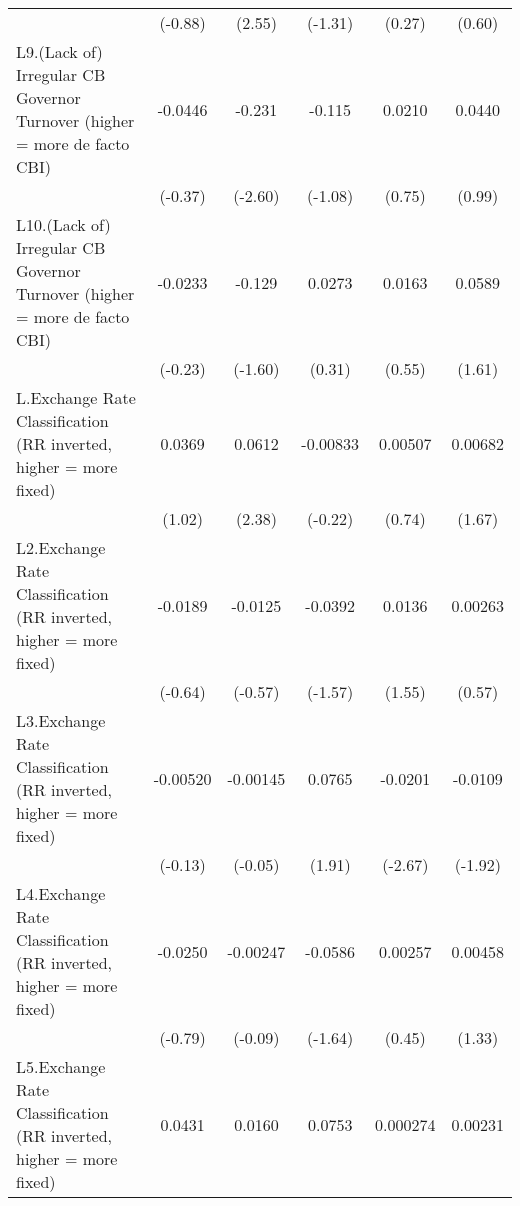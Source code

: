 {\begin{longtable}{l*{5}{c}}
                &  (-0.88)         &   (2.55)         &  (-1.31)         &   (0.27)         &   (0.60)         \\
\addlinespace
L9.(Lack of) Irregular CB Governor Turnover (higher = more de facto CBI)&  -0.0446         &   -0.231\sym{*}  &   -0.115         &   0.0210         &   0.0440         \\
                &  (-0.37)         &  (-2.60)         &  (-1.08)         &   (0.75)         &   (0.99)         \\
\addlinespace
L10.(Lack of) Irregular CB Governor Turnover (higher = more de facto CBI)&  -0.0233         &   -0.129         &   0.0273         &   0.0163         &   0.0589         \\
                &  (-0.23)         &  (-1.60)         &   (0.31)         &   (0.55)         &   (1.61)         \\
\addlinespace
L.Exchange Rate Classification (RR inverted, higher = more fixed)&   0.0369         &   0.0612\sym{*}  & -0.00833         &  0.00507         &  0.00682         \\
                &   (1.02)         &   (2.38)         &  (-0.22)         &   (0.74)         &   (1.67)         \\
\addlinespace
L2.Exchange Rate Classification (RR inverted, higher = more fixed)&  -0.0189         &  -0.0125         &  -0.0392         &   0.0136         &  0.00263         \\
                &  (-0.64)         &  (-0.57)         &  (-1.57)         &   (1.55)         &   (0.57)         \\
\addlinespace
L3.Exchange Rate Classification (RR inverted, higher = more fixed)& -0.00520         & -0.00145         &   0.0765         &  -0.0201\sym{**} &  -0.0109         \\
                &  (-0.13)         &  (-0.05)         &   (1.91)         &  (-2.67)         &  (-1.92)         \\
\addlinespace
L4.Exchange Rate Classification (RR inverted, higher = more fixed)&  -0.0250         & -0.00247         &  -0.0586         &  0.00257         &  0.00458         \\
                &  (-0.79)         &  (-0.09)         &  (-1.64)         &   (0.45)         &   (1.33)         \\
\addlinespace
L5.Exchange Rate Classification (RR inverted, higher = more fixed)&   0.0431         &   0.0160         &   0.0753\sym{*}  & 0.000274         &  0.00231         \\

\end{longtable}}
